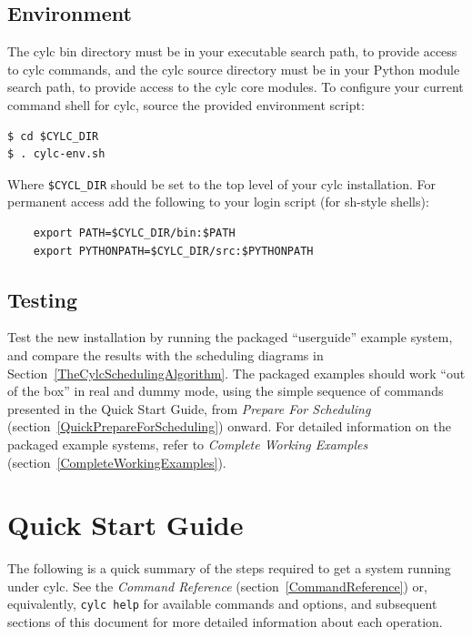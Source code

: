 \documentclass[11pt,a4paper]{article}
\begin{document}
\subsection{Environment} 
\label{Environment}

The cylc bin directory must be in your executable search path, to
provide access to cylc commands, and the cylc source directory must be
in your Python module search path, to provide access to the cylc core
modules. To configure your current command shell for cylc, source 
the provided environment script:

\lstset{language=bash} 

\begin{lstlisting}
$ cd $CYLC_DIR
$ . cylc-env.sh
\end{lstlisting}

Where \lstinline=$CYCL_DIR= should be set to the top level of your cylc 
installation.  For permanent access add the following to your login
script (for sh-style shells):

\begin{lstlisting}
    export PATH=$CYLC_DIR/bin:$PATH
    export PYTHONPATH=$CYLC_DIR/src:$PYTHONPATH
\end{lstlisting}


\subsection{Testing} 
\label{Testing}

Test the new installation by running the packaged ``userguide'' example
system, and compare the results with the scheduling diagrams in
Section~\ref{TheCylcSchedulingAlgorithm}. The packaged examples should
work ``out of the box'' in real and dummy mode, using the simple
sequence of commands presented in the Quick Start Guide, from {\em
Prepare For Scheduling} (section~\ref{QuickPrepareForScheduling})
onward.  For detailed information on the packaged example systems, refer
to {\em Complete Working Examples}
(section~\ref{CompleteWorkingExamples}).  

\pagebreak
\section{Quick Start Guide} 
\label{QuickStartGuide}

The following is a quick summary of the steps required to get a system
running under cylc. See the {\em Command Reference}
(section~\ref{CommandReference}) or, equivalently, \lstinline=cylc help=
for available commands and options, and subsequent sections
of this document for more detailed information about each operation.
\end{document}
